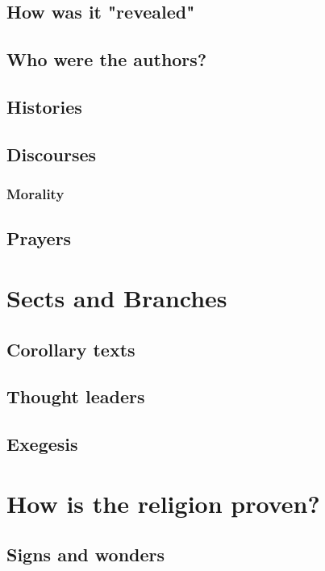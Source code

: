 \documentclass[12pt, letterpaper]{article}
\begin{document}
\subsection{How was it "revealed"}

\subsection{Who were the authors?}

\subsection{Histories}

\subsection{Discourses}

\subsubsection{Morality}

\subsection{Prayers}

\section{Sects and Branches}

\subsection{Corollary texts}

\subsection{Thought leaders}

\subsection{Exegesis}

\section{How is the religion proven?}

\subsection{Signs and wonders}
\end{document}
